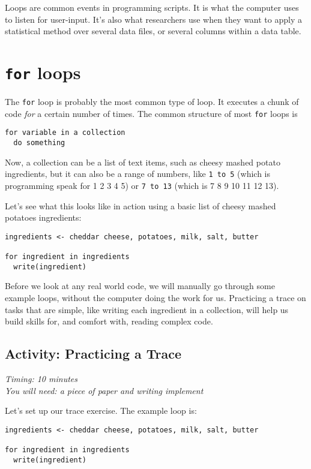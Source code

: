 \documentclass[
]{book}
\begin{document}
Loops are common events in programming scripts. It is what the computer uses to listen for user-input. It's also what researchers use when they want to apply a statistical method over several data files, or several columns within a data table.

\section{\texorpdfstring{\texttt{for} loops}{for loops}}\label{for-loops}

The \texttt{for} loop is probably the most common type of loop. It executes a chunk of code \emph{for} a certain number of times. The common structure of most \texttt{for} loops is

\begin{verbatim}
for variable in a collection
  do something
\end{verbatim}

Now, a collection can be a list of text items, such as cheesy mashed potato ingredients, but it can also be a range of numbers, like \texttt{1\ to\ 5} (which is programming speak for 1 2 3 4 5) or \texttt{7\ to\ 13} (which is 7 8 9 10 11 12 13).

Let's see what this looks like in action using a basic list of cheesy mashed potatoes ingredients:

\begin{verbatim}
ingredients <- cheddar cheese, potatoes, milk, salt, butter

for ingredient in ingredients
  write(ingredient)
\end{verbatim}

Before we look at any real world code, we will manually go through some example loops, without the computer doing the work for us. Practicing a trace on tasks that are simple, like writing each ingredient in a collection, will help us build skills for, and comfort with, reading complex code.

\subsection{Activity: Practicing a Trace}\label{activity-practicing-a-trace}

\emph{Timing: 10 minutes}\\
\emph{You will need: a piece of paper and writing implement}

Let's set up our trace exercise. The example loop is:

\begin{verbatim}
ingredients <- cheddar cheese, potatoes, milk, salt, butter

for ingredient in ingredients
  write(ingredient)
\end{verbatim}
\end{document}

